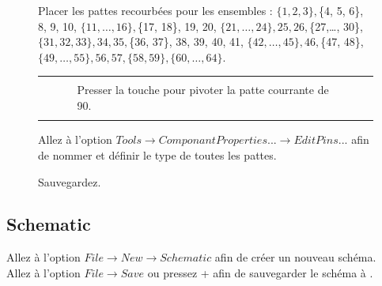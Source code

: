 \documentclass{report}
\begin{document}
\begin{figure}[!ht]
{\begin{inparaitem}[\phantom{\qquad}$\circ$]
		\item Placer les pattes recourbées pour les ensembles : $\{1, 2, 3\}, $\{4, 5, 6\}, 8, 9, 10, $\{11,\dots, 16\}, $\{17, 18\}, 19, 20, $\{21,\dots, 24\}, 25, 26, $\{27,\dots, 30\}, $\{31, 32, 33\}, 34, 35, $\{36, 37\}, 38, 39, 40, 41, $\{42,\dots, 45\}, 46, $\{47, 48\}, $\{49,\dots, 55\}, 56, 57, \{58, 59\}, \{60,\dots, 64\}$.
		    \begin{tabular}{ p{0.1\linewidth} p{0.8\linewidth} p{0.1\linewidth} }
				    && \\
				    & Presser la touche \Spacebar pour pivoter la patte courrante de 90\degres. & \\
				    && \\
		    \end{tabular}
		\item Allez à l'option $Tools \rightarrow Componant Properties... \rightarrow Edit Pins...$ afin de nommer et définir le type de toutes les pattes. \\
		\item Sauvegardez.
	    \end{inparaitem}
	}
\end{figure}

\newpage
\subsection{Schematic}

Allez à l'option $File \rightarrow New \rightarrow Schematic$ afin de créer un nouveau schéma. \\
Allez à l'option $File \rightarrow Save$ ou pressez \Ctrl +  afin de sauvegarder le schéma à . \\
\end{document}
